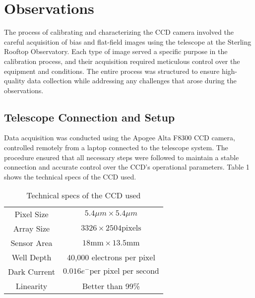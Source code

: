 \documentclass[linenumbers,twocolumn]{aastex631}
\begin{document}
\section{Observations} \label{sec:observations}

The process of calibrating and characterizing the CCD camera involved the careful acquisition of bias and flat-field images using the telescope at the Sterling Rooftop Observatory. Each type of image served a specific purpose in the calibration process, and their acquisition required meticulous control over the equipment and conditions. The entire process was structured to ensure high-quality data collection while addressing any challenges that arose during the observations.

\subsection{Telescope Connection and Setup}
Data acquisition was conducted using the Apogee Alta F8300 CCD camera, controlled remotely from a laptop connected to the telescope system. The procedure ensured that all necessary steps were followed to maintain a stable connection and accurate control over the CCD's operational parameters. Table 1 shows the technical specs of the CCD used.

\begin{table}[h]
    \centering
    \begin{tabular}{c|c}
        Pixel Size & $5.4 \mu m \times 5.4 \mu m$ \\
        Array Size & $3326 \times 2504 \text{pixels}$ \\
        Sensor Area & $18 \text{mm} \times 13.5 \text{mm}$ \\
        Well Depth & 40,000 electrons per pixel \\
        Dark Current & $0.016 e^{-} \text{per pixel per second}$ \\
        Linearity & Better than 99\% \\
    \end{tabular}
    \caption{Technical specs of the CCD used}
    \label{tab:my_label}
\end{table}
\end{document}
